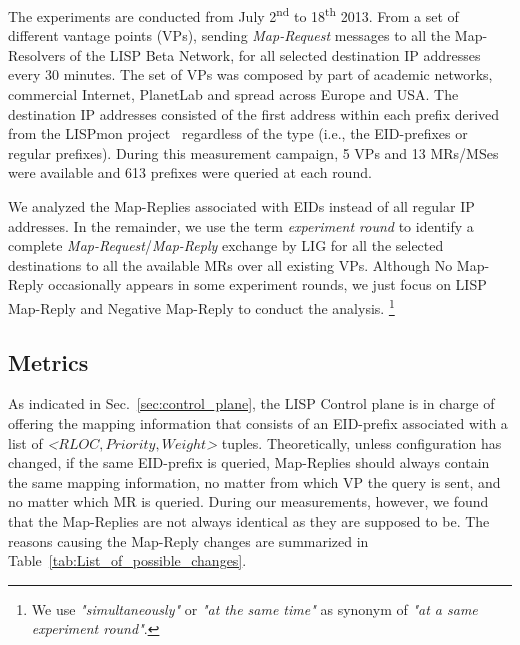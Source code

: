 The experiments are conducted from July 2\textsuperscript{nd} to 18\textsuperscript{th} 2013. From a set of different vantage points (VPs), sending \emph{Map-Request} messages to all the Map-Resolvers of the LISP Beta Network, for all selected destination IP addresses every 30 minutes.  The set of VPs was composed by part of academic networks, commercial Internet, PlanetLab and spread across Europe and USA. The destination IP addresses consisted of the first address within each prefix derived from the LISPmon project~\cite{lispmon} regardless of the type (i.e., the EID-prefixes or regular prefixes). During this measurement campaign, 5 VPs and 13 MRs/MSes were available and 613 prefixes were queried at each round. 

We analyzed the Map-Replies associated with EIDs instead of all regular IP addresses. In the remainder, we use the term \emph{experiment round} to
identify a complete \emph{Map-Request}/\emph{Map-Reply} exchange by LIG for all the selected destinations to all the available MRs over all existing VPs. Although No Map-Reply occasionally appears in some experiment rounds, we just focus on LISP Map-Reply and Negative Map-Reply to conduct the analysis. \footnote{We use \emph{"simultaneously"} or \emph{"at the same
time"} as synonym of \emph{"at a same experiment round"}.}


\subsection{Metrics}
\label{mds_metrics}
As indicated in Sec.~\ref{sec:control_plane}, the LISP Control plane is in charge of offering the mapping information that consists of an EID-prefix associated with a list of \emph{<$RLOC, Priority, Weight$>} tuples. Theoretically, unless configuration has changed, if the same EID-prefix is queried, Map-Replies should always contain the same mapping information, no matter from which VP the query is sent, and no matter which MR is queried. During our measurements, however, we found that the Map-Replies are not always identical as they are supposed to be. The reasons causing the Map-Reply changes are summarized in Table~\ref{tab:List_of_possible_changes}. 

